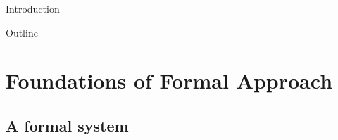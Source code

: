 \documentclass[aspectratio=169, 12pt, fleqn]{beamer}
\begin{document}
\begin{frame}{Introduction}
\begin{figure}
\end{figure}
\end{frame}

\begin{frame}{Outline}
  \tableofcontents
\end{frame}

\section{Foundations of Formal Approach}

\subsection{A formal system}
\end{document}
